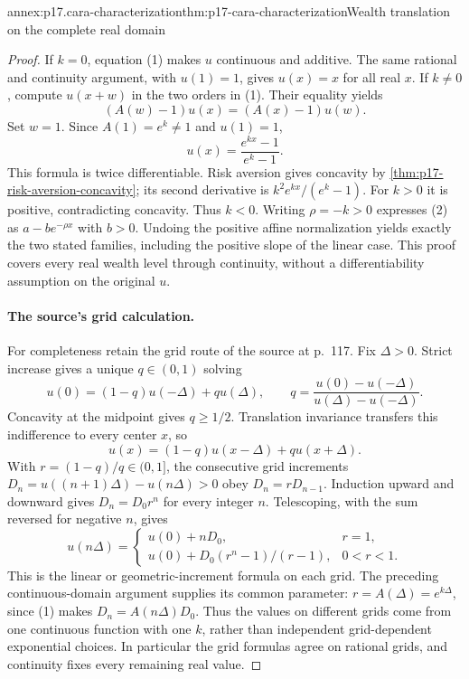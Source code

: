 \begin{annexitem}{annex:p17.cara-characterization}{thm:p17-cara-characterization}{Wealth translation on the complete real domain}
\begin{proof}
If \(k=0\), equation (1) makes \(u\) continuous and additive.
The same rational and continuity argument, with \(u(1)=1\), gives
\(u(x)=x\) for all real \(x\).
If \(k\ne0\), compute \(u(x+w)\) in the two orders in (1).
Their equality yields
\[
                         (A(w)-1)u(x)=(A(x)-1)u(w).
\]
Set \(w=1\). Since \(A(1)=e^k\ne1\) and \(u(1)=1\),
\[
                            u(x)=\frac{e^{kx}-1}{e^k-1}.
\tag{2}
\]
This formula is twice differentiable. Risk aversion gives concavity
by \cref{thm:p17-risk-aversion-concavity}; its second derivative is
\(k^2e^{kx}/(e^k-1)\). For \(k>0\) it is positive, contradicting
concavity. Thus \(k<0\). Writing \(\rho=-k>0\) expresses (2)
as \(a-b e^{-\rho x}\) with \(b>0\). Undoing the positive affine
normalization yields exactly the two stated families, including
the positive slope of the linear case. This proof covers every
real wealth level through continuity, without a differentiability
assumption on the original \(u\).

\paragraph{The source's grid calculation.}
For completeness retain the grid route of the source at p.~117.
Fix \(\Delta>0\). Strict increase gives a unique \(q\in(0,1)\)
solving
\[
             u(0)=(1-q)u(-\Delta)+q u(\Delta),\qquad
             q=\frac{u(0)-u(-\Delta)}{u(\Delta)-u(-\Delta)}.
\]
Concavity at the midpoint gives \(q\geq1/2\). Translation invariance
transfers this indifference to every center \(x\), so
\[
            u(x)=(1-q)u(x-\Delta)+q u(x+\Delta).
\]
With \(r=(1-q)/q\in(0,1]\), the consecutive grid increments
\(D_n=u((n+1)\Delta)-u(n\Delta)>0\) obey \(D_n=rD_{n-1}\).
Induction upward and downward gives \(D_n=D_0r^n\) for every integer
\(n\). Telescoping, with the sum reversed for negative \(n\), gives
\[
 u(n\Delta)=
 \begin{cases}
 u(0)+nD_0,&r=1,\\
 u(0)+D_0(r^n-1)/(r-1),&0<r<1.
 \end{cases}
\]
This is the linear or geometric-increment formula on each grid.
The preceding continuous-domain argument supplies its common parameter:
\(r=A(\Delta)=e^{k\Delta}\), since (1) makes
\(D_n=A(n\Delta)D_0\). Thus the values on different grids come from
one continuous function with one \(k\), rather than independent
grid-dependent exponential choices. In particular the grid formulas
agree on rational grids, and continuity fixes every remaining real value.


\end{proof}
\end{annexitem}
